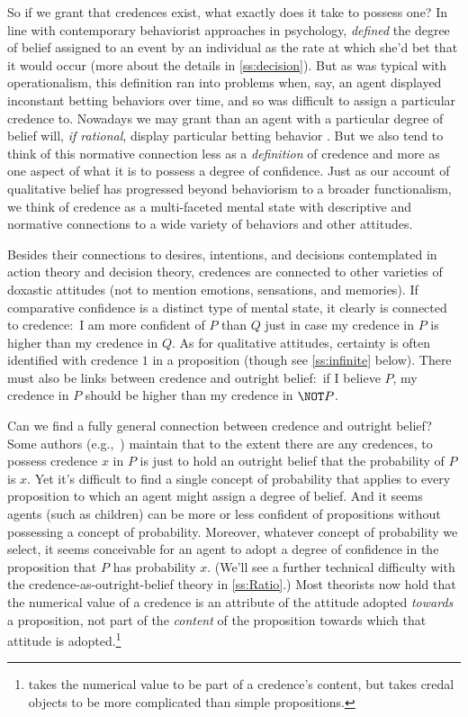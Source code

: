 So if we grant that credences exist, what exactly does it take to possess one? In line with contemporary behaviorist approaches in psychology, \citet{deFinettiForesight} \emph{defined} the degree of belief assigned to an event by an individual as the rate at which she'd bet that it would occur (more about the details in \autoref{ss:decision}). But as was typical with operationalism, this definition ran into problems when, say, an agent displayed inconstant betting behaviors over time, and so was difficult to assign a particular credence to. Nowadays we may grant than an agent with a particular degree of belief will, \emph{if rational}, display particular betting behavior \citep{ChristensenPlace}. But we also tend to think of this normative connection less as a \emph{definition} of credence and more as one aspect of what it is to possess a degree of confidence. Just as our account of qualitative belief has progressed beyond behaviorism to a broader functionalism, we think of credence as a multi-faceted mental state with descriptive and normative connections to a wide variety of behaviors and other attitudes.

Besides their connections to desires, intentions, and decisions contemplated in action theory and decision theory, credences are connected to other varieties of doxastic attitudes (not to mention emotions, sensations, and memories). If comparative confidence is a distinct type of mental state, it clearly is connected to credence:\ I am more confident of $P$ than $Q$ just in case my credence in $P$ is higher than my credence in $Q$. As for qualitative attitudes, certainty is often identified with credence $1$ in a proposition (though see \autoref{ss:infinite} below). There must also be links between credence and outright belief:\ if I believe $P$, my credence in $P$ should be higher than my credence in $\NOT P$. 

Can we find a fully general connection between credence and outright belief? Some authors (e.g.,\ \citealp{HoltonModel}) maintain that to the extent there are any credences, to possess credence $x$ in $P$ is just to hold an outright belief that the probability of $P$ is $x$.\label{titelbaum-outright} Yet it's difficult to find a single concept of probability that applies to every proposition to which an agent might assign a degree of belief. And it seems agents (such as children) can be more or less confident of propositions without possessing a concept of probability. Moreover, whatever concept of probability we select, it seems conceivable for an agent to adopt a degree of confidence in the proposition that $P$ has probability $x$. (We'll see a further technical difficulty with the credence-as-outright-belief theory in \autoref{ss:Ratio}.) Most theorists now hold that the numerical value of a credence is an attribute of the attitude adopted \emph{towards} a proposition, not part of the \emph{content} of the proposition towards which that attitude is adopted.\footnote
{\citet{MossProbabilistic} takes the numerical value to be part of a credence's content, but takes credal objects to be more complicated than simple propositions.}

